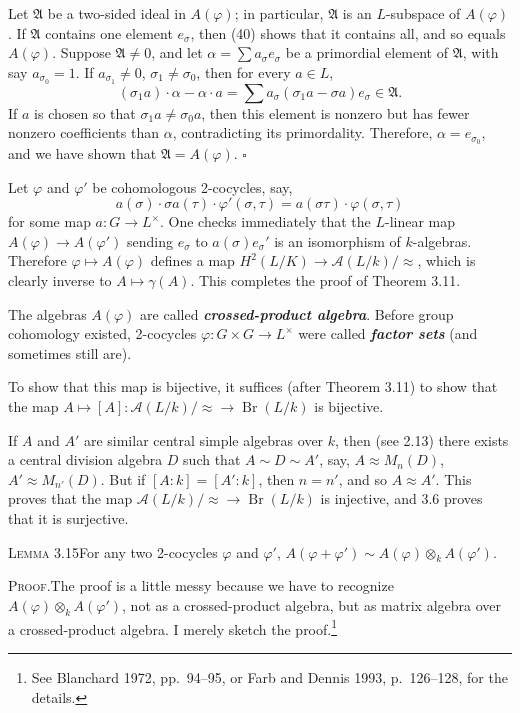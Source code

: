 Let $\mathfrak{A}$ be a two-sided ideal in $A(\varphi)$; in particular, $\mathfrak{A}$ is an $L$-subspace of $A(\varphi)$. If $\mathfrak{A}$ contains one element $e_\sigma$, then (40) shows that it contains all, and so equals $A(\varphi)$. Suppose $\mathfrak{A}\neq0$, and let $\alpha=\sum a_\sigma e_\sigma$ be a primordial element of $\mathfrak{A}$, with say $a_{\sigma_0}=1$. If $a_{\sigma_1}\neq0$, $\sigma_1\neq\sigma_0$, then for every $a\in L$,
\[
(\sigma_1 a)\cdot\alpha-\alpha\cdot a=\sum a_\sigma(\sigma_1 a-\sigma a)e_\sigma\in\mathfrak{A}.
\]
If $a$ is chosen so that $\sigma_1 a\neq\sigma_0 a$, then this element is nonzero but has fewer nonzero coefficients than $\alpha$, contradicting its primordality. Therefore, $\alpha=e_{\sigma_0}$, and we have shown that $\mathfrak{A}=A(\varphi)$. \hfill$\square$

Let $\varphi$ and $\varphi'$ be cohomologous 2-cocycles, say,
\[
a(\sigma)\cdot\sigma a(\tau)\cdot\varphi'(\sigma,\tau)=a(\sigma\tau)\cdot\varphi(\sigma,\tau)
\]
for some map $a\colon G\to L^\times$. One checks immediately that the $L$-linear map $A(\varphi)\to A(\varphi')$ sending $e_\sigma$ to $a(\sigma)e_\sigma'$ is an isomorphism of $k$-algebras. Therefore $\varphi\mapsto A(\varphi)$ defines a map $H^2(L/K)\to\mathcal{A}(L/k)/\approx$, which is clearly inverse to $A\mapsto\gamma(A)$. This completes the proof of Theorem 3.11.

The algebras $A(\varphi)$ are called \textbf{\textit{crossed-product algebra}}. Before group cohomology existed, 2-cocycles $\varphi\colon G\times G\to L^\times$ were called \textbf{\textit{factor sets}} (and sometimes still are).

To show that this map is bijective, it suffices (after Theorem 3.11) to show that the map $A\mapsto[A]\colon\mathcal{A}(L/k)/\approx\to\operatorname{Br}(L/k)$ is bijective.

If $A$ and $A'$ are similar central simple algebras over $k$, then (see 2.13) there exists a central division algebra $D$ such that $A\sim D\sim A'$, say, $A\approx M_n(D)$, $A'\approx M_{n'}(D)$. But if $[A:k]=[A':k]$, then $n=n'$, and so $A\approx A'$. This proves that the map $\mathcal{A}(L/k)/\approx\to\operatorname{Br}(L/k)$ is injective, and 3.6 proves that it is surjective.

\noindent\textsc{Lemma 3.15}\quad For any two 2-cocycles $\varphi$ and $\varphi'$, $A(\varphi+\varphi')\sim A(\varphi)\otimes_k A(\varphi')$.

\noindent\textsc{Proof.}\quad The proof is a little messy because we have to recognize $A(\varphi)\otimes_k A(\varphi')$, not as a crossed-product algebra, but as matrix algebra over a crossed-product algebra. I merely sketch the proof.\footnote[4]{See Blanchard 1972, pp.\ 94--95, or Farb and Dennis 1993, p.\ 126--128, for the details.}

